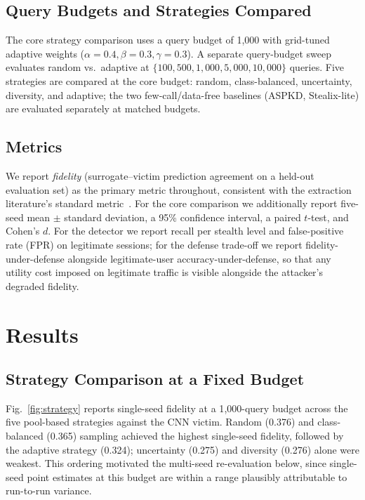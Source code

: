 \documentclass[journal,10pt]{IEEEtran}
\begin{document}
\subsection{Query Budgets and Strategies Compared}

The core strategy comparison uses a query budget of 1{,}000 with grid-tuned adaptive weights
($\alpha=0.4,\beta=0.3,\gamma=0.3$). A separate query-budget sweep evaluates random vs.\ adaptive
at $\{100, 500, 1{,}000, 5{,}000, 10{,}000\}$ queries. Five strategies are compared at the core
budget: random, class-balanced, uncertainty, diversity, and adaptive; the two few-call/data-free
baselines (ASPKD, Stealix-lite) are evaluated separately at matched budgets.

\subsection{Metrics}

We report \emph{fidelity} (surrogate--victim prediction agreement on a held-out evaluation set) as
the primary metric throughout, consistent with the extraction literature's standard
metric~\cite{oliynyk2023survey}. For the core comparison we additionally report five-seed
mean $\pm$ standard deviation, a 95\% confidence interval, a paired $t$-test, and Cohen's $d$. For
the detector we report recall per stealth level and false-positive rate (FPR) on legitimate
sessions; for the defense trade-off we report fidelity-under-defense alongside legitimate-user
accuracy-under-defense, so that any utility cost imposed on legitimate traffic is visible alongside
the attacker's degraded fidelity.

\section{Results}
\label{sec:results}

\subsection{Strategy Comparison at a Fixed Budget}

Fig.~\ref{fig:strategy} reports single-seed fidelity at a 1{,}000-query budget across the five
pool-based strategies against the CNN victim. Random (0.376) and class-balanced (0.365) sampling
achieved the highest single-seed fidelity, followed by the adaptive strategy (0.324); uncertainty
(0.275) and diversity (0.276) alone were weakest. This ordering motivated the multi-seed
re-evaluation below, since single-seed point estimates at this budget are within a range plausibly
attributable to run-to-run variance.
\end{document}
